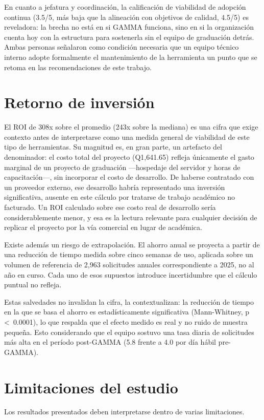 En cuanto a jefatura y coordinación, la calificación de viabilidad de adopción continua (3.5/5, más baja que la alineación con objetivos de calidad, 4.5/5) es reveladora: la brecha no está en si GAMMA funciona, sino en si la organización cuenta hoy con la estructura para sostenerla sin el equipo de graduación detrás. Ambas personas señalaron como condición necesaria que un equipo técnico interno adopte formalmente el mantenimiento de la herramienta un punto que se retoma en las recomendaciones de este trabajo.

\section{Retorno de inversión}
El ROI de 308x sobre el promedio (243x sobre la mediana) es una cifra que exige contexto antes de interpretarse como una medida general de viabilidad de este tipo de herramientas. Su magnitud es, en gran parte, un artefacto del denominador: el costo total del proyecto (Q1,641.65) refleja únicamente el gasto marginal de un proyecto de graduación —hospedaje del servidor y horas de capacitación—, sin incorporar el costo de desarrollo. De haberse contratado con un proveedor externo, ese desarrollo habría representado una inversión significativa, ausente en este cálculo por tratarse de trabajo académico no facturado. Un ROI calculado sobre ese costo real de desarrollo sería considerablemente menor, y esa es la lectura relevante para cualquier decisión de replicar el proyecto por la vía comercial en lugar de académica.

Existe además un riesgo de extrapolación. El ahorro anual se proyecta a partir de una reducción de tiempo medida sobre cinco semanas de uso, aplicada sobre un volumen de referencia de 2,963 solicitudes anuales correspondiente a 2025, no al año en curso. Cada uno de esos supuestos introduce incertidumbre que el cálculo puntual no refleja.

Estas salvedades no invalidan la cifra, la contextualizan: la reducción de tiempo en la que se basa el ahorro es estadísticamente significativa (Mann-Whitney, p \textless\ 0.0001), lo que respalda que el efecto medido es real y no ruido de muestra pequeña. Esto considerando que el equipo sostuvo una tasa diaria de solicitudes más alta en el período post-GAMMA (5.8 frente a 4.0 por día hábil pre-GAMMA).


\section{Limitaciones del estudio}
Los resultados presentados deben interpretarse dentro de varias limitaciones.

